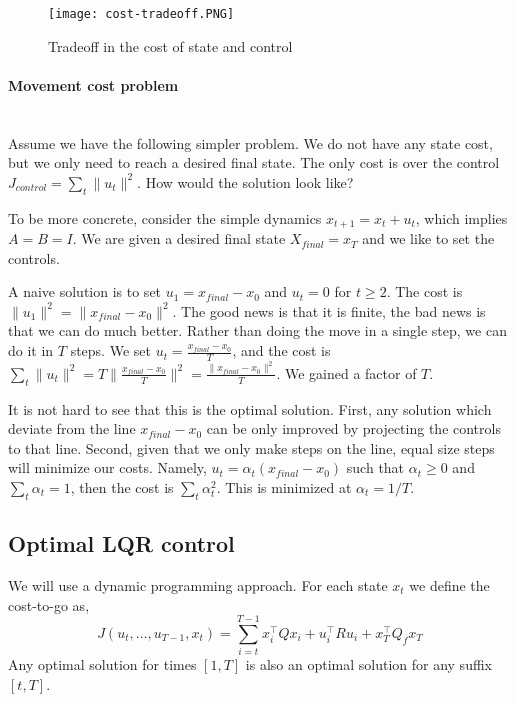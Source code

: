 \begin{figure}
  \begin{centering}
  \texttt{[image: cost-tradeoff.PNG]}\\
  \caption{Tradeoff in the cost of state and control}\label{fig:L12-cost-tradeoff}
  \end{centering}
\end{figure}


\paragraph{Movement cost problem}\ \\

Assume we have the following simpler problem. We do not have any
state cost, but we only need to reach a desired final state. The
only cost is over the control $J_{control}=\sum_t \|u_t\|^2$. How
would the solution look like?

To be more concrete, consider the simple dynamics $x_{t+1}=x_t+u_t$,
which implies $A=B=I$. We are given a desired final state
$X_{final}=x_T$ and we like to set the controls.

A naive solution is to set $u_1=x_{final}-x_0$ and $u_t=0$ for
$t\geq 2$. The cost is $\|u_1\|^2=\|x_{final}-x_0\|^2$. The good
news is that it is finite, the bad news is that we can do much
better. Rather than doing the move in a single step, we can do it in
$T$ steps. We set $u_t= \frac{x_{final}-x_0}{T}$, and the cost is
$\sum_t \|u_t\|^2=T\|\frac{x_{final}-x_0}{T}\|^2=
\frac{\|x_{final}-x_0\|^2}{T}$. We gained a factor of $T$.

It is not hard to see that this is the optimal solution. First, any
solution which deviate from the line $x_{final}-x_0$ can be only
improved by projecting the controls to that line. Second, given that
we only make steps on the line, equal size steps will minimize our
costs. Namely, $u_t = \alpha_t (x_{final}-x_0)$ such that
$\alpha_t\geq 0$ and $\sum_t\alpha_t=1$, then the cost is $\sum_t
\alpha_t^2$. This is minimized at $\alpha_t=1/T$.

\subsection{Optimal LQR control}

We will use a dynamic programming approach. For each state $x_t$ we
define the cost-to-go as,
\[
J(u_t, \ldots, u_{T-1},x_t)=\sum_{i=t}^{T-1}x_i^\top Qx_i+u_i^\top R
u_i+ x_T^\top Q_f x_T
\]
Any optimal solution for times $[1,T]$ is also an optimal solution
for any suffix $[t,T]$.

